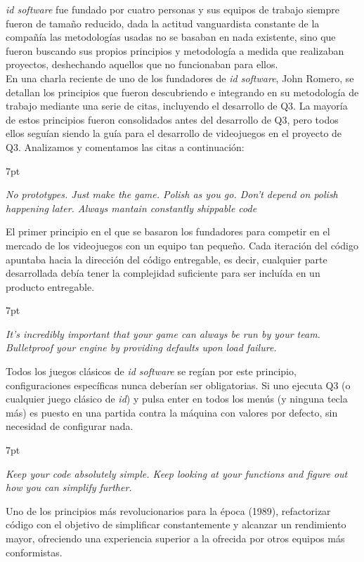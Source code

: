 \documentclass[a4paper,12pt]{report}
\newenvironment{formal}{%
	\def\FrameCommand{%
		\hspace{1pt}%
		{\color{darkblue}\vrule width 2pt}%
		{\color{formalshade}\vrule width 4pt}%
		\colorbox{formalshade}%
	}%
	\MakeFramed{\advance\hsize-\width\FrameRestore}%
	\noindent\hspace{-4.55pt}%
	\begin{adjustwidth}{}{7pt}%
		\vspace{2pt}\vspace{2pt}%
	}
	{%
		\vspace{2pt}\end{adjustwidth}\endMakeFramed%
}
\begin{document}
	\textit{id software} fue fundado por cuatro personas y sus equipos de trabajo siempre fueron de tamaño reducido, dada la actitud vanguardista constante de la compañía las metodologías usadas no se basaban en nada existente, sino que fueron buscando sus propios principios y metodología a medida que realizaban proyectos, deshechando aquellos que no funcionaban para ellos.\\
	
	En una charla reciente de uno de los fundadores de \textit{id software}, John Romero, se detallan los principios que fueron descubriendo e integrando en su metodología de trabajo mediante una serie de citas, incluyendo el desarrollo de Q3. La mayoría de estos principios fueron consolidados antes del desarrollo de Q3, pero todos ellos seguían siendo la guía para el desarrollo de videojuegos en el proyecto de Q3. Analizamos y comentamos las citas a continuación:
	
	\begin{formal}
		\textit{No prototypes. Just make the game. Polish as you go. Don't depend on polish happening later. Always mantain constantly shippable code}
	\end{formal}
	El primer principio en el que se basaron los fundadores para competir en el mercado de los videojuegos con un equipo tan pequeño. Cada iteración del código apuntaba hacia la dirección del código entregable, es decir, cualquier parte desarrollada debía tener la complejidad suficiente para ser incluída en un producto entregable.
	
	\begin{formal}
		\textit{ It's incredibly important that your game can always be run by your team. Bulletproof your engine by providing defaults upon load failure.}
	\end{formal}
	Todos los juegos clásicos de \textit{id software} se regían por este principio, configuraciones específicas nunca deberían ser obligatorias. Si uno ejecuta Q3 (o cualquier juego clásico de \textit{id}) y pulsa enter en todos los menús (y ninguna tecla más) es puesto en una partida contra la máquina con valores por defecto, sin necesidad de configurar nada.
	
	\begin{formal}
		\textit{Keep your code absolutely simple. Keep looking at your functions and figure out how you can simplify further.}
	\end{formal}
	Uno de los principios más revolucionarios para la época (1989), refactorizar código con el objetivo de simplificar constantemente y alcanzar un rendimiento mayor, ofreciendo una experiencia superior a la ofrecida por otros equipos más conformistas.
	
\end{document}
